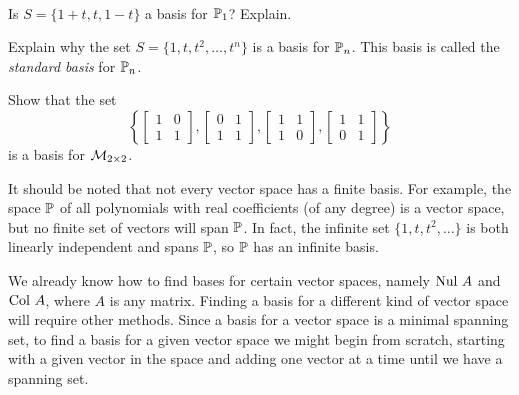 \begin{activity} \label{act:5_b_1} ~
	\ba
	\item Is $S = \{1+t, t, 1-t\}$ a basis for $\mathbb{P}_1$? Explain.



	\item Explain why the set $S = \{1, t, t^2, \ldots, t^n\}$ is a basis for $\mathbb{P}_n$. This basis is called the \emph{standard basis} for $\mathbb{P}_n$.



	\item Show that the set 
	\[\left\{ \left[ \begin{array}{cc} 1&0 \\ 1&1 \end{array} \right], \left[ \begin{array}{cc} 0&1 \\ 1&1 \end{array} \right], \left[ \begin{array}{cc} 1&1 \\ 1&0 \end{array} \right], \left[ \begin{array}{cc} 1&1 \\ 0&1 \end{array} \right] \right\}\]
	is a basis for $\mathcal{M}_{2 \times 2}$. 

	\ea
\end{activity}



It should be noted that not every vector space has a finite basis. For example, the space $\mathbb{P}$ of all polynomials with real coefficients (of any degree) is a vector space, but no finite set of vectors will span $\mathbb{P}$. In fact, the infinite set $\{1, t, t^2, \ldots\}$ is both linearly independent and spans $\mathbb{P}$, so $\mathbb{P}$ has an infinite basis. 


We already know how to find bases for certain vector spaces, namely $\text{Nul } A$ and $\text{Col } A$, where $A$ is any matrix. Finding a basis for a different kind of vector space will require other methods. Since a basis for a vector space is a minimal spanning set, to find a basis for a given vector space we might begin from scratch, starting with a given vector in the space and adding one vector at a time until we have a spanning set. 


